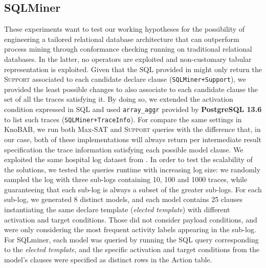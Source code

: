 \subsection{SQLMiner}\label{ssec:sqlmin}
These experiments want to test our working hypotheses for the possibility of engineering a tailored relational database architecture that can outperform process mining through conformance checking running on traditional relational databases. In the latter, no \LTLf operators are exploited and non-customary tabular representation is exploited. Given that the SQL provided in \cite{Schonig15,SchonigRCJM16} might only return the \textsc{Support} associated to each candidate declare clause (\texttt{SQLMiner+Support}), we provided the least possible changes to also associate to each candidate clause the set of all the traces satisfying it. By doing so, we extended the activation condition expressed in SQL and used \texttt{array\_aggr} provided by \textbf{PostgreSQL 13.6} to list such traces (\texttt{SQLMiner+TraceInfo}). For compare the same settings in KnoBAB, we run both Max-SAT and \textsc{Support} queries with the difference that, in our case, both of these implementations will always return per intermediate result specification the trace information satisfying each possible model clause.
We exploited the same hospital log dataset from \cite{SchonigRCJM16}. In order to test the scalability of the solutions, we tested the queries runtime with increasing log size: we randomly sampled the log with three sub-logs containing 10, 100 and 1000 traces, while guaranteeing that each sub-log is always a subset of the greater sub-logs. For each sub-log, we generated 8 distinct models, and each model contains 25 clauses instantiating the same declare template (\textit{elected template}) with different activation and target conditions. Those did not consider payload conditions, and were only considering the most frequent activity labels appearing in the sub-log. For SQLminer, each model was queried by running the SQL query corresponding to the \textit{elected template}, and the specific activation and target conditions from the model's clauses were specified as distinct rows in the \textsf{Action} table.


